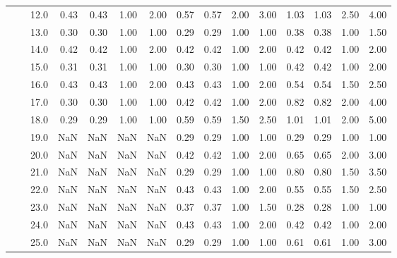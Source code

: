 \begin{tabular}{lllrrrrrrrrrrrr}
       &     & 12.0 &       0.43 &      0.43 & 1.00 &   2.00 &       0.57 &      0.57 & 2.00 &   3.00 &       1.03 &      1.03 & 2.50 &   4.00 \\
       &     & 13.0 &       0.30 &      0.30 & 1.00 &   1.00 &       0.29 &      0.29 & 1.00 &   1.00 &       0.38 &      0.38 & 1.00 &   1.50 \\
       &     & 14.0 &       0.42 &      0.42 & 1.00 &   2.00 &       0.42 &      0.42 & 1.00 &   2.00 &       0.42 &      0.42 & 1.00 &   2.00 \\
       &     & 15.0 &       0.31 &      0.31 & 1.00 &   1.00 &       0.30 &      0.30 & 1.00 &   1.00 &       0.42 &      0.42 & 1.00 &   2.00 \\
       &     & 16.0 &       0.43 &      0.43 & 1.00 &   2.00 &       0.43 &      0.43 & 1.00 &   2.00 &       0.54 &      0.54 & 1.50 &   2.50 \\
       &     & 17.0 &       0.30 &      0.30 & 1.00 &   1.00 &       0.42 &      0.42 & 1.00 &   2.00 &       0.82 &      0.82 & 2.00 &   4.00 \\
       &     & 18.0 &       0.29 &      0.29 & 1.00 &   1.00 &       0.59 &      0.59 & 1.50 &   2.50 &       1.01 &      1.01 & 2.00 &   5.00 \\
       &     & 19.0 &        NaN &       NaN &  NaN &    NaN &       0.29 &      0.29 & 1.00 &   1.00 &       0.29 &      0.29 & 1.00 &   1.00 \\
       &     & 20.0 &        NaN &       NaN &  NaN &    NaN &       0.42 &      0.42 & 1.00 &   2.00 &       0.65 &      0.65 & 2.00 &   3.00 \\
       &     & 21.0 &        NaN &       NaN &  NaN &    NaN &       0.29 &      0.29 & 1.00 &   1.00 &       0.80 &      0.80 & 1.50 &   3.50 \\
       &     & 22.0 &        NaN &       NaN &  NaN &    NaN &       0.43 &      0.43 & 1.00 &   2.00 &       0.55 &      0.55 & 1.50 &   2.50 \\
       &     & 23.0 &        NaN &       NaN &  NaN &    NaN &       0.37 &      0.37 & 1.00 &   1.50 &       0.28 &      0.28 & 1.00 &   1.00 \\
       &     & 24.0 &        NaN &       NaN &  NaN &    NaN &       0.43 &      0.43 & 1.00 &   2.00 &       0.42 &      0.42 & 1.00 &   2.00 \\
       &     & 25.0 &        NaN &       NaN &  NaN &    NaN &       0.29 &      0.29 & 1.00 &   1.00 &       0.61 &      0.61 & 1.00 &   3.00 \\

\end{tabular}
